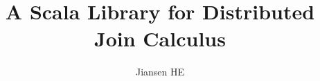 \documentclass[coverpage]{inftechrep}
\begin{document}
\title{A Scala Library for Distributed Join Calculus}
\author{Jiansen HE}

%
%





\end{document}
